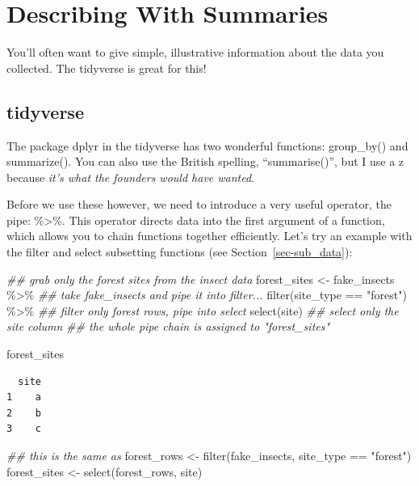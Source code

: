 \documentclass[
  letterpaper,
  DIV=11,
  numbers=noendperiod]{scrreprt}
\newenvironment{Shaded}{\begin{snugshade}}{\end{snugshade}}
\newcommand{\DocumentationTok}[1]{\textcolor[rgb]{0.37,0.37,0.37}{\textit{#1}}}
\newcommand{\FunctionTok}[1]{\textcolor[rgb]{0.28,0.35,0.67}{#1}}
\newcommand{\NormalTok}[1]{\textcolor[rgb]{0.00,0.23,0.31}{#1}}
\newcommand{\OtherTok}[1]{\textcolor[rgb]{0.00,0.23,0.31}{#1}}
\newcommand{\SpecialCharTok}[1]{\textcolor[rgb]{0.37,0.37,0.37}{#1}}
\newcommand{\StringTok}[1]{\textcolor[rgb]{0.13,0.47,0.30}{#1}}
\begin{document}
\section{Describing With Summaries}\label{describing-with-summaries}

You'll often want to give simple, illustrative information about the
data you collected. The tidyverse is great for this!

\subsection{tidyverse}\label{tidyverse-2}

The package dplyr in the tidyverse has two wonderful functions:
group\_by() and summarize(). You can also use the British spelling,
``summarise()'', but I use a z because \emph{it's what the founders
would have wanted}.

Before we use these however, we need to introduce a very useful
operator, the pipe: \%\textgreater\%. This operator directs data into
the first argument of a function, which allows you to chain functions
together efficiently. Let's try an example with the filter and select
subsetting functions (see Section~\ref{sec-sub_data}):

\begin{Shaded}
\begin{Highlighting}[]
\DocumentationTok{\#\# grab only the forest sites from the insect data}
\NormalTok{forest\_sites }\OtherTok{\textless{}{-}}\NormalTok{ fake\_insects }\SpecialCharTok{\%\textgreater{}\%} \DocumentationTok{\#\# take fake\_insects and pipe it into filter...}
  \FunctionTok{filter}\NormalTok{(site\_type }\SpecialCharTok{==} \StringTok{"forest"}\NormalTok{) }\SpecialCharTok{\%\textgreater{}\%} \DocumentationTok{\#\# filter only forest rows, pipe into select}
  \FunctionTok{select}\NormalTok{(site) }\DocumentationTok{\#\# select only the site column}
\DocumentationTok{\#\# the whole pipe chain is assigned to "forest\_sites"}

\NormalTok{forest\_sites}
\end{Highlighting}
\end{Shaded}

\begin{verbatim}
  site
1    a
2    b
3    c
\end{verbatim}

\begin{Shaded}
\begin{Highlighting}[]
\DocumentationTok{\#\# this is the same as}
\NormalTok{forest\_rows }\OtherTok{\textless{}{-}} \FunctionTok{filter}\NormalTok{(fake\_insects, site\_type }\SpecialCharTok{==} \StringTok{"forest"}\NormalTok{)}
\NormalTok{forest\_sites }\OtherTok{\textless{}{-}} \FunctionTok{select}\NormalTok{(forest\_rows, site)}
\end{Highlighting}
\end{Shaded}
\end{document}
